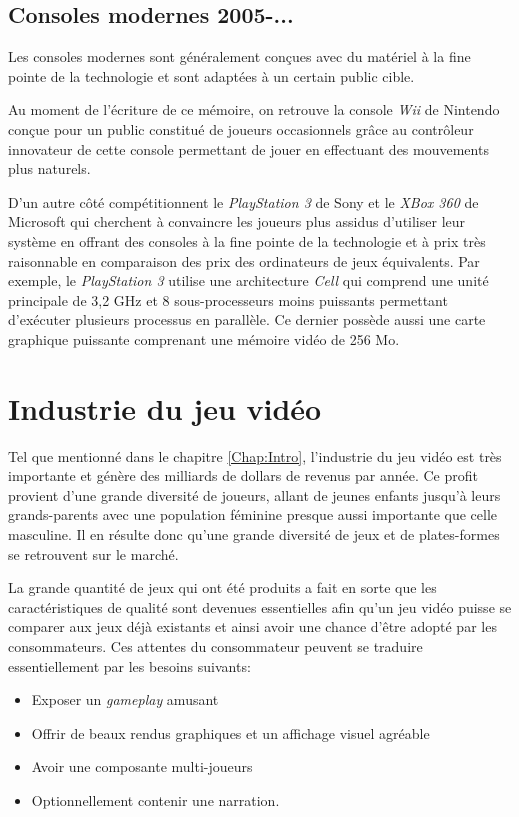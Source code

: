 \documentclass[12pt,twoside,letterpaper,francais]{book}
\begin{document}
\FloatBarrier
\subsection{Consoles modernes 2005-...}
Les consoles modernes sont généralement conçues avec du matériel à la
fine pointe de la technologie et sont adaptées à un certain public
cible.

Au moment de l'écriture de ce mémoire, on retrouve la console
\textit{Wii} de Nintendo conçue pour un public constitué de joueurs
occasionnels grâce au contrôleur innovateur de cette console
permettant de jouer en effectuant des mouvements plus naturels.

D'un autre côté compétitionnent le \textit{PlayStation 3} de Sony et
le \textit{XBox 360} de Microsoft qui cherchent à convaincre les
joueurs plus assidus d'utiliser leur système en offrant des consoles à
la fine pointe de la technologie et à prix très raisonnable en
comparaison des prix des ordinateurs de jeux équivalents. Par exemple,
le \textit{PlayStation 3} utilise une architecture \textit{Cell} qui
comprend une unité principale de 3,2 GHz et 8 sous-processeurs moins
puissants permettant d'exécuter plusieurs processus en parallèle. Ce
dernier possède aussi une carte graphique puissante comprenant une
mémoire vidéo de 256 Mo.


\FloatBarrier
\section{Industrie du jeu vidéo}
Tel que mentionné dans le chapitre \ref{Chap:Intro}, l'industrie du
jeu vidéo est très importante et génère des milliards de dollars de
revenus par année. Ce profit provient d'une grande diversité de
joueurs, allant de jeunes enfants jusqu'à leurs grands-parents avec
une population féminine presque aussi importante que celle
masculine. Il en résulte donc qu'une grande diversité de jeux et de
plates-formes se retrouvent sur le marché.

La grande quantité de jeux qui ont été produits a fait en sorte que
les caractéristiques de qualité sont devenues essentielles afin qu'un
jeu vidéo puisse se comparer aux jeux déjà existants et ainsi avoir
une chance d'être adopté par les consommateurs. Ces attentes du
consommateur peuvent se traduire essentiellement par les besoins
suivants:

\begin{itemize}
\item Exposer un \textit{gameplay} amusant
\item Offrir de beaux rendus graphiques et un affichage visuel
  agréable
\item Avoir une composante multi-joueurs
\item Optionnellement contenir une narration.
\end{itemize}
\end{document}
